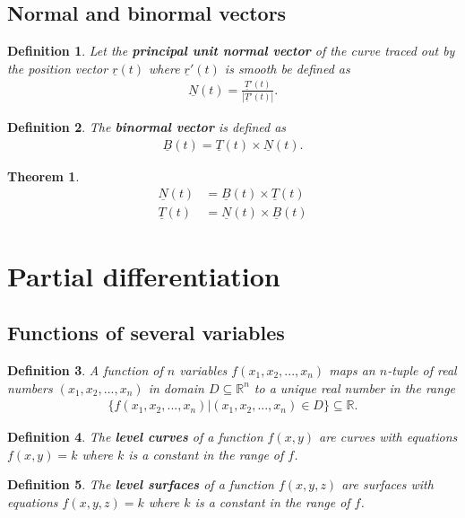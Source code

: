 \documentclass{article}
\theoremstyle{sltheorem}
\newtheorem{definition}{Definition}[section]
\newtheorem{theorem}{Theorem}[section]
\newcommand{\R}{\mathbb{R}}
\renewcommand{\vec}{\underline}
\newcommand*\B[1]{\textbf{#1}}
\begin{document}
\subsection{Normal and binormal vectors}
\begin{definition}
    Let the \B{principal unit normal vector} of the curve traced out by the position vector $\vec r(t)$
    where $\vec r'(t)$ is smooth be defined as
    \begin{align*}
        \vec N (t) = \frac{\vec T'(t)}{\left| \vec T'(t) \right|}.
    \end{align*}
\end{definition}
\begin{definition}
    The \B{binormal vector} is defined as
    \begin{align*}
        \vec B(t) = \vec T(t) \times \vec N(t).
    \end{align*}
\end{definition}
\begin{theorem}
    \begin{align*}
        \vec N(t) &= \vec B(t) \times \vec T(t)\\
        \vec T(t) &= \vec N(t) \times \vec B(t)
    \end{align*}
\end{theorem}
\section{Partial differentiation}
\subsection{Functions of several variables}
\begin{definition}
    A function of $n$ variables $f(x_1, x_2, ..., x_n)$ maps an $n$-tuple
    of real numbers $(x_1, x_2, ..., x_n)$ in domain $D\subseteq\R^n$ to
    a unique real number in the range
    \begin{align*}
        \{f(x_1, x_2, ..., x_n)|(x_1, x_2, ..., x_n)\in D\} \subseteq \R.
    \end{align*}
\end{definition}
\begin{definition}
    The \B{level curves} of a function $f(x,y)$ are curves with equations
    $f(x,y)=k$ where $k$ is a constant in the range of $f$.
\end{definition}
\begin{definition}
    The \B{level surfaces} of a function $f(x,y,z)$ are surfaces with
    equations $f(x,y,z)=k$ where $k$ is a constant in the range of $f$.
\end{definition}
\end{document}
